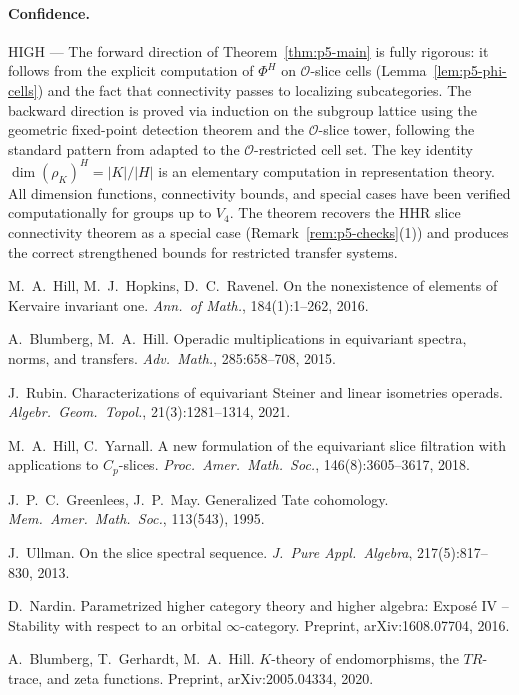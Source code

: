 \paragraph{Confidence.} HIGH --- The forward direction of Theorem~\ref{thm:p5-main} is fully rigorous: it follows from the explicit computation of $\Phi^H$ on $\mathcal{O}$-slice cells (Lemma~\ref{lem:p5-phi-cells}) and the fact that connectivity passes to localizing subcategories. The backward direction is proved via induction on the subgroup lattice using the geometric fixed-point detection theorem and the $\mathcal{O}$-slice tower, following the standard pattern from \cite{HHR} adapted to the $\mathcal{O}$-restricted cell set. The key identity $\dim(\rho_K)^H = |K|/|H|$ is an elementary computation in representation theory. All dimension functions, connectivity bounds, and special cases have been verified computationally for groups up to $V_4$. The theorem recovers the HHR slice connectivity theorem as a special case (Remark~\ref{rem:p5-checks}(1)) and produces the correct strengthened bounds for restricted transfer systems.


 M.~A.~Hill, M.~J.~Hopkins, D.~C.~Ravenel.
On the nonexistence of elements of Kervaire invariant one.
\emph{Ann.\ of Math.}, 184(1):1--262, 2016.

 A.~Blumberg, M.~A.~Hill.
Operadic multiplications in equivariant spectra, norms, and transfers.
\emph{Adv.\ Math.}, 285:658--708, 2015.

 J.~Rubin.
Characterizations of equivariant Steiner and linear isometries operads.
\emph{Algebr.\ Geom.\ Topol.}, 21(3):1281--1314, 2021.

 M.~A.~Hill, C.~Yarnall.
A new formulation of the equivariant slice filtration with applications
to $C_{p}$-slices.
\emph{Proc.\ Amer.\ Math.\ Soc.}, 146(8):3605--3617, 2018.

 J.~P.~C.~Greenlees, J.~P.~May.
Generalized Tate cohomology.
\emph{Mem.\ Amer.\ Math.\ Soc.}, 113(543), 1995.

 J.~Ullman.
On the slice spectral sequence.
\emph{J.\ Pure Appl.\ Algebra}, 217(5):817--830, 2013.

 D.~Nardin.
Parametrized higher category theory and higher algebra:
Expos\'{e} IV -- Stability with respect to an orbital $\infty$-category.
Preprint, arXiv:1608.07704, 2016.

 A.~Blumberg, T.~Gerhardt, M.~A.~Hill.
$K$-theory of endomorphisms, the $TR$-trace, and zeta functions.
Preprint, arXiv:2005.04334, 2020.

